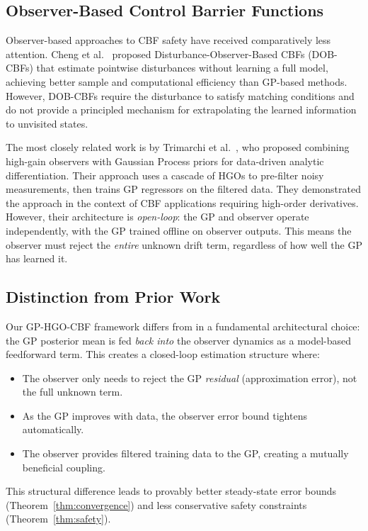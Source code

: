 \documentclass[letterpaper, 10 pt, conference]{ieeeconf}
\begin{document}
\subsection{Observer-Based Control Barrier Functions}

Observer-based approaches to CBF safety have received comparatively less attention. Cheng et al.\ \cite{cheng2022dobcbf} proposed Disturbance-Observer-Based CBFs (DOB-CBFs) that estimate pointwise disturbances without learning a full model, achieving better sample and computational efficiency than GP-based methods. However, DOB-CBFs require the disturbance to satisfy matching conditions and do not provide a principled mechanism for extrapolating the learned information to unvisited states.

The most closely related work is by Trimarchi et al.\ \cite{trimarchi2022hgogp}, who proposed combining high-gain observers with Gaussian Process priors for data-driven analytic differentiation. Their approach uses a cascade of HGOs to pre-filter noisy measurements, then trains GP regressors on the filtered data. They demonstrated the approach in the context of CBF applications requiring high-order derivatives. However, their architecture is \emph{open-loop}: the GP and observer operate independently, with the GP trained offline on observer outputs. This means the observer must reject the \emph{entire} unknown drift term, regardless of how well the GP has learned it.

\subsection{Distinction from Prior Work}

Our GP-HGO-CBF framework differs from \cite{trimarchi2022hgogp} in a fundamental architectural choice: the GP posterior mean is fed \emph{back into} the observer dynamics as a model-based feedforward term. This creates a closed-loop estimation structure where:
\begin{itemize}
    \item The observer only needs to reject the GP \emph{residual} (approximation error), not the full unknown term.
    \item As the GP improves with data, the observer error bound tightens automatically.
    \item The observer provides filtered training data to the GP, creating a mutually beneficial coupling.
\end{itemize}
This structural difference leads to provably better steady-state error bounds (Theorem~\ref{thm:convergence}) and less conservative safety constraints (Theorem~\ref{thm:safety}).
\end{document}

